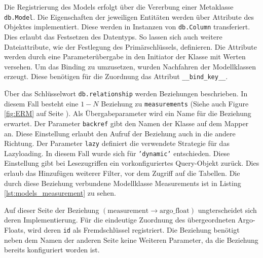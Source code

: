     
Die Registrierung des Models erfolgt über die Vererbung einer Metaklasse \texttt{db.Model}. Die Eigenschaften der jeweiligen Entitäten werden über Attribute des Objektes implementiert. Diese werden in Instanzen von \texttt{db.Column} transferiert. Dies erlaubt das Festsetzen des Datentyps. So lassen sich auch weitere Dateiattribute, wie der Festlegung des  Primärschlüssels, definieren. Die Attribute werden durch eine Parameterübergabe in den Initiator der Klasse mit Werten versehen.  
Um das Binding zu umzusetzen, wurden Nachfahren der Modellklassen erzeugt. Diese benötigen für die Zuordnung das Attribut \texttt{\_\_bind\_key\_\_}.


Über das Schlüsselwort \texttt{db.relationship} werden Beziehungen beschrieben. In diesem Fall besteht eine $1 - N$ Beziehung zu \texttt{measurements} (Siehe auch Figure \ref{fig:ERM} auf Seite \pageref{fig:ERM}). Als Übergabeparameter wird ein Name für die Beziehung erwartet. Der Parameter \texttt{backref} gibt den Namen der Klasse auf dem Mapper an. Diese Einstellung erlaubt den Aufruf der Beziehung auch in die andere Richtung. Der Parameter \texttt{lazy} definiert die verwendete Strategie für das Lazyloading. In diesem Fall wurde sich für \texttt{'dynamic'} entschieden. Diese Einstellung gibt bei Lesezugriffen ein vorkonfiguriertes Query-Objekt zurück. Dies erlaub das Hinzufügen weiterer Filter, vor dem Zugriff auf die Tabellen. Die durch diese Beziehung verbundene Modellklasse Measurements ist in Listing \ref{lst:models_measurement} zu sehen.


Auf dieser Seite der Beziehung   $\left( \mbox{measurement} \to \mbox{argo\_float} \right)$ ungterscheidet sich deren Implementierung. Für die eindeutige Zuordnung des übergeordneten Argo-Floats, wird deren \texttt{id} als Fremdschlüssel registriert. Die Beziehung benötigt neben dem Namen der anderen Seite keine Weiteren Parameter, da die Beziehung bereits konfiguriert worden ist.




